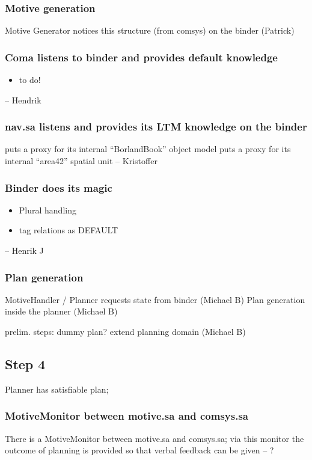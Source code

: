 \documentclass{article}
\begin{document}
\subsubsection{Motive generation}
Motive Generator notices this structure (from comsys) on the binder (Patrick)

\subsubsection{Coma listens to binder and provides default knowledge}
\begin{itemize}
	\item to do!
\end{itemize}
-- Hendrik

\subsubsection{nav.sa listens and provides its LTM knowledge on the binder}
puts a proxy for its internal ``BorlandBook'' object model
puts a proxy for its internal ``area42'' spatial unit
-- Kristoffer

\subsubsection{Binder does its magic}
\begin{itemize}
	\item Plural handling
	\item tag relations as DEFAULT
\end{itemize}
-- Henrik J

\subsubsection{Plan generation}
MotiveHandler / Planner requests state from binder (Michael B)
Plan generation inside the planner (Michael B)

prelim. steps: dummy plan? extend planning domain (Michael B)


\subsection{Step 4}
Planner has satisfiable plan; 

\subsubsection{MotiveMonitor between motive.sa and comsys.sa}
There is a MotiveMonitor between motive.sa and comsys.sa; via this monitor
the outcome of planning is provided so that verbal feedback can be given
-- ?
\end{document}
